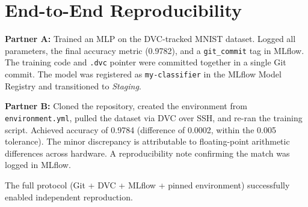 \documentclass[10pt, a4paper]{article}
\begin{document}
\section{End-to-End Reproducibility}

\textbf{Partner A:} Trained an MLP on the DVC-tracked MNIST dataset. Logged all parameters, the final accuracy metric (0.9782), and a \texttt{git\_commit} tag in MLflow. The training code and \texttt{.dvc} pointer were committed together in a single Git commit. The model was registered as \texttt{my-classifier} in the MLflow Model Registry and transitioned to \textit{Staging}.

\textbf{Partner B:} Cloned the repository, created the environment from \texttt{environment.yml}, pulled the dataset via DVC over SSH, and re-ran the training script. Achieved accuracy of 0.9784 (difference of 0.0002, within the 0.005 tolerance). The minor discrepancy is attributable to floating-point arithmetic differences across hardware. A reproducibility note confirming the match was logged in MLflow.

The full protocol (Git + DVC + MLflow + pinned environment) successfully enabled independent reproduction.
\end{document}

